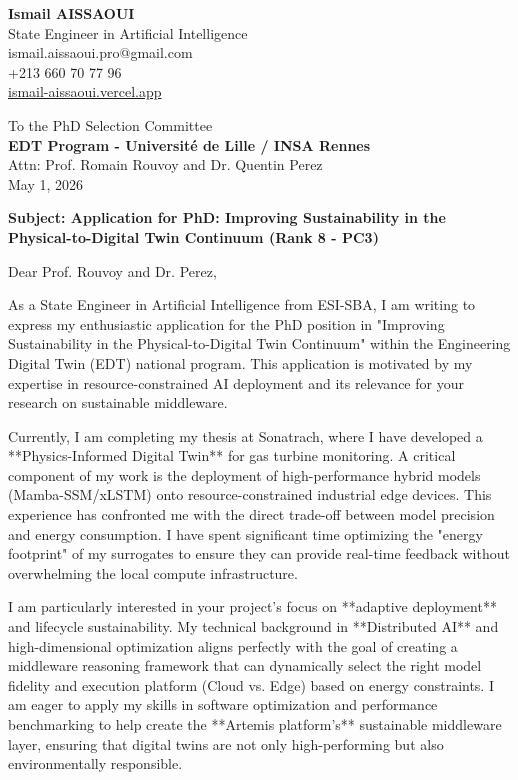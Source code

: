 \documentclass[a4paper,12pt]{article}
\begin{document}
\begin{flushleft}
    \textbf{Ismail AISSAOUI} \\
    State Engineer in Artificial Intelligence \\
    ismail.aissaoui.pro@gmail.com \\
    +213 660 70 77 96 \\
    \href{https://ismail-aissaoui.vercel.app}{ismail-aissaoui.vercel.app}
\end{flushleft}

\begin{flushright}
    To the PhD Selection Committee \\
    \textbf{EDT Program - Université de Lille / INSA Rennes} \\
    Attn: Prof. Romain Rouvoy and Dr. Quentin Perez \\
    \medskip
    May 1, 2026
\end{flushright}

\bigskip

\noindent \textbf{Subject: Application for PhD: Improving Sustainability in the Physical-to-Digital Twin Continuum (Rank 8 - PC3)}

\bigskip

Dear Prof. Rouvoy and Dr. Perez,

As a State Engineer in Artificial Intelligence from ESI-SBA, I am writing to express my enthusiastic application for the PhD position in "Improving Sustainability in the Physical-to-Digital Twin Continuum" within the Engineering Digital Twin (EDT) national program. This application is motivated by my expertise in resource-constrained AI deployment and its relevance for your research on sustainable middleware.

Currently, I am completing my thesis at Sonatrach, where I have developed a **Physics-Informed Digital Twin** for gas turbine monitoring. A critical component of my work is the deployment of high-performance hybrid models (Mamba-SSM/xLSTM) onto resource-constrained industrial edge devices. This experience has confronted me with the direct trade-off between model precision and energy consumption. I have spent significant time optimizing the "energy footprint" of my surrogates to ensure they can provide real-time feedback without overwhelming the local compute infrastructure.

I am particularly interested in your project's focus on **adaptive deployment** and lifecycle sustainability. My technical background in **Distributed AI** and high-dimensional optimization aligns perfectly with the goal of creating a middleware reasoning framework that can dynamically select the right model fidelity and execution platform (Cloud vs. Edge) based on energy constraints. I am eager to apply my skills in software optimization and performance benchmarking to help create the **Artemis platform's** sustainable middleware layer, ensuring that digital twins are not only high-performing but also environmentally responsible.
\end{document}
